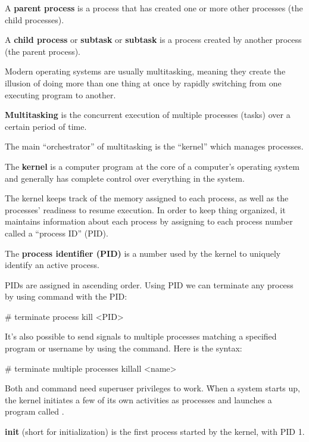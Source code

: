 A \textbf{parent process} is a process that has created one or more other processes (the child processes).
\ed

A \textbf{child process} or \textbf{subtask} or \textbf{subtask} is a process created by another process (the parent
process).
\ed

Modern operating systems are usually multitasking, meaning they create the illusion of doing more than one thing at
once by rapidly switching from one executing program to another.

\bd[Multitasking]
\textbf{Multitasking} is the concurrent execution of multiple processes (tasks) over a certain period of time.
\ed

The main ``orchestrator'' of multitasking is the ``kernel'' which manages processes.

\bd[Kernel]
The \textbf{kernel} is a computer program at the core of a computer's operating system and generally has complete
control over everything in the system.
\ed

The kernel keeps track of the memory assigned to each process, as well as the processes' readiness to resume
execution. In order to keep thing organized, it maintains information about each process by assigning to each process
number called a ``process ID'' (PID).

The \textbf{process identifier (PID)} is a number used by the kernel to uniquely identify an active process.
\ed

PIDs are assigned in ascending order. Using PID we can terminate any process by using  command with the PID:
\begin{bash}
# terminate process
kill <PID>
\end{bash}

It's also possible to send signals to multiple processes matching a specified program or username by using the
 command. Here is the syntax:
\begin{bash}
# terminate multiple processes
killall <name>
\end{bash}

Both  and  command need superuser privileges to work. \v

When a system starts up, the kernel initiates a few of its own activities as processes and launches a program called
.

\bd[init]
\textbf{init} (short for initialization) is the first process started by the kernel, with PID 1.
\ed


